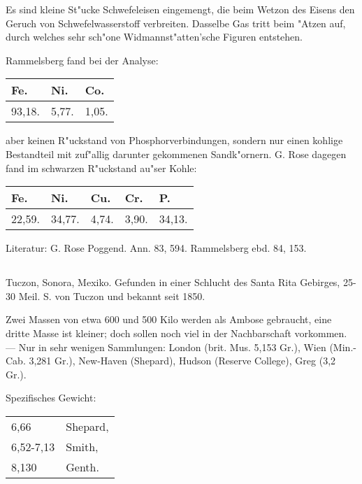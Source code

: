 \documentclass[a4paper, 11pt, oneside]{article}
\begin{document}
Es sind kleine St"ucke Schwefeleisen eingemengt, die beim Wetzon des Eisens den Geruch von Schwefelwasserstoff verbreiten. Dasselbe Gas tritt beim "Atzen auf, durch welches sehr sch"one Widmannst"atten'sche Figuren entstehen.

Rammelsberg fand bei der Analyse:
\begin{table}[H]
    \centering\swabfamily\Large
    \begin{tabular}{l l l}
        Fe. & Ni. & Co. \\ \hline
        93,18. & 5,77. & 1,05. \\
    \end{tabular}
\end{table}

aber keinen R"uckstand von Phosphorverbindungen, sondern nur einen kohlige Bestandteil mit zuf"allig darunter gekommenen Sandk"ornern. G. Rose dagegen fand im schwarzen R"uckstand au"ser Kohle:
\begin{table}[H]
    \centering\swabfamily\Large
    \begin{tabular}{l l l l l}
        Fe. & Ni. & Cu. & Cr. & P. \\ \hline
        22,59. & 34,77. & 4,74. & 3,90. & 34,13. \\
    \end{tabular}
\end{table}

\normalsize
Literatur: G. Rose Poggend. Ann. 83, 594. Rammelsberg ebd. 84, 153.

\subsection{}
\LARGE
\paragraph{}
Tuczon, Sonora, Mexiko. Gefunden in einer Schlucht des Santa Rita Gebirges, 25-30 Meil. S. von Tuczon und bekannt seit 1850.

Zwei Massen von etwa 600 und 500 Kilo werden als Ambose gebraucht, eine dritte Masse ist kleiner; doch sollen noch viel in der Nachbarschaft vorkommen. --- Nur in sehr wenigen Sammlungen: London (brit. Mus. 5,153 Gr.), Wien (Min.-Cab. 3,281 Gr.), New-Haven (Shepard), Hudson (Reserve College), Greg (3,2 Gr.).

Spezifisches Gewicht:  
\begin{table}[!ht]
    \centering\swabfamily\Large
    \begin{tabular}{l l}
        6,66 & Shepard,\\
        6,52-7,13 & Smith,\\
        8,130 & Genth.
    \end{tabular}
\end{table}
\end{document}
